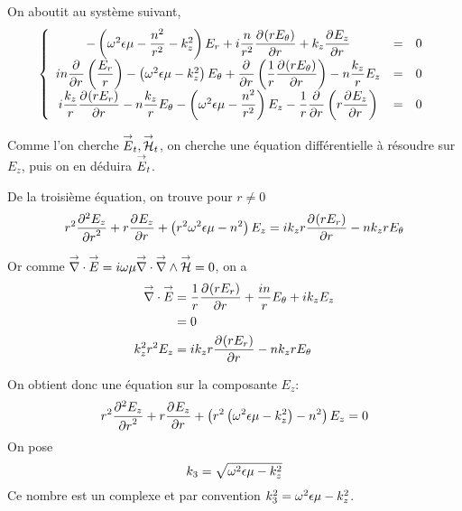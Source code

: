    On aboutit au système suivant,
    \begin{equation}
        \left\lbrace
        \begin{array}{ccc}
            -\left(\w^2\eps\mu -\frac{n^2}{r^2}  - k_z^2\right)E_r  +i\frac{n}{r^2}\ddr{r}{(rE_\theta)}  +k_z\ddr{r}{E_z} & = & 0\\
            in\ddr{r}{}\left(\frac{E_r}{r}\right) -\left(\w^2\eps\mu - k_z^2\right)E_\theta + \ddr{r}{}\left(\frac{1}{r}\ddr{r}{(rE_\theta)}\right)  - n\frac{k_z}{r}E_z & = & 0\\
            i\frac{k_z}{r}\ddr{r}{(rE_r)}  - n\frac{k_z}{r}E_\theta  -\left(\w^2\eps\mu - \frac{n^2}{r^2} \right)E_z - \frac{1}{r}\ddr{r}{}\left(r\ddr{r}{E_z}\right) & = & 0
        \end{array}
        \right.
    \end{equation}

    Comme l'on cherche $\vE_t, \vH_t$, on cherche une équation différentielle à résoudre sur $E_z$, puis on en déduira $\vE_t$.

    De la troisième  équation, on trouve pour $r\not=0$
    \begin{equation}
    r^2 \ddr[2]{r}{E_z} + r\ddr{r}{E_z} + \left(r^2\w^2\eps\mu - n^2\right)E_z =ik_zr\ddr{r}{(rE_r)} -  nk_zrE_\theta
    \end{equation}


    Or comme $\vdiv \vE = i\w\mu\vdiv\vrot\vH = 0$, on a
    \begin{align}
        \vdiv\vE &= \frac{1}{r}\ddr{r}{(rE_r)} + \frac{in}{r}E_\theta + ik_zE_z
        \\
        &=0
        \\
        k_z^2r^2 E_z &= ik_zr\ddr{r}{(rE_r)} - nk_zrE_\theta
    \end{align}

    On obtient donc une équation sur la composante $E_z$:
    \begin{equation}
        r^2 \ddr[2]{r}{E_z} + r\ddr{r}{E_z} + \left(r^2\left(\w^2\eps\mu - k_z^2\right) - n^2\right)E_z = 0
    \end{equation}
    On pose 
    \begin{equation}
        k_3 = \sqrt{\w^2\eps\mu - k_z^2}
    \end{equation}
    Ce nombre est un complexe et par convention $k_3^2 = \w^2\eps\mu - k_z^2$.

